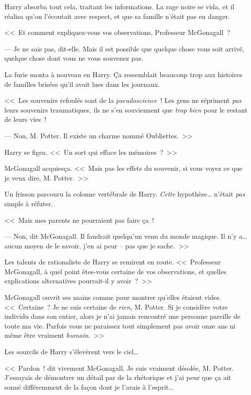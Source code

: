 Harry absorba tout cela, traitant les informations. La rage noire se vida, et il réalisa qu'on l'écoutait avec respect, et que sa famille n'était pas en danger.

<<~Et comment expliquez-vous vos observations, Professeur McGonagall~?

--- Je ne sais pas, dit-elle. Mais il est possible que quelque chose vous soit arrivé, quelque chose dont vous ne vous souvenez pas.

La furie monta à nouveau en Harry. Ça ressemblait beaucoup trop aux histoires de familles brisées qu'il avait lues dans les journaux.

<<~Les souvenirs refoulés sont de la \emph{pseudoscience}~! Les gens ne répriment \emph{pas} leurs souvenirs traumatiques, ils ne s'en souviennent que \emph{trop bien} pour le restant de leurs vies~!

--- Non, M. Potter. Il existe un charme nommé Oubliettes.~>>

Harry se figea. <<~Un sort qui efface les mémoires~?~>>

McGonagall acquiesça. <<~Mais pas les effets du souvenir, si vous voyez ce que je veux dire, M. Potter.~>>

Un frisson parcouru la colonne vertébrale de Harry. \emph{Cette} hypothèse… n'était \emph{pas} simple à réfuter.

<<~Mais mes parents ne pourraient pas faire ça~!

--- Non, dit McGonagall. Il faudrait quelqu'un venu du monde magique. Il n'y a… aucun moyen de le savoir, j'en ai peur -- pas que je sache.~>>

Les talents de rationaliste de Harry se remirent en route. <<~Professeur McGonagall, à quel point êtes-vous certaine de vos observations, et quelles explications alternatives pourrait-il y avoir~?~>>

McGonagall ouvrit ses mains comme pour montrer qu'elles étaient vides. <<~Certaine~? Je ne suis certaine de \emph{rien}, M. Potter. Si je considère votre individu dans son entier, alors je n'ai jamais rencontré une personne pareille de toute ma vie. Parfois vous ne paraissez tout simplement pas avoir onze ans ni même être vraiment \emph{humain}.~>>

Les sourcils de Harry s'élevèrent vers le ciel…

<<~Pardon~! dit vivement McGonagall. Je suis vraiment désolée, M. Potter. J'essayais de démontrer un détail par de la rhétorique et j'ai peur que ça ait sonné différemment de la façon dont je l'avais à l'esprit…

